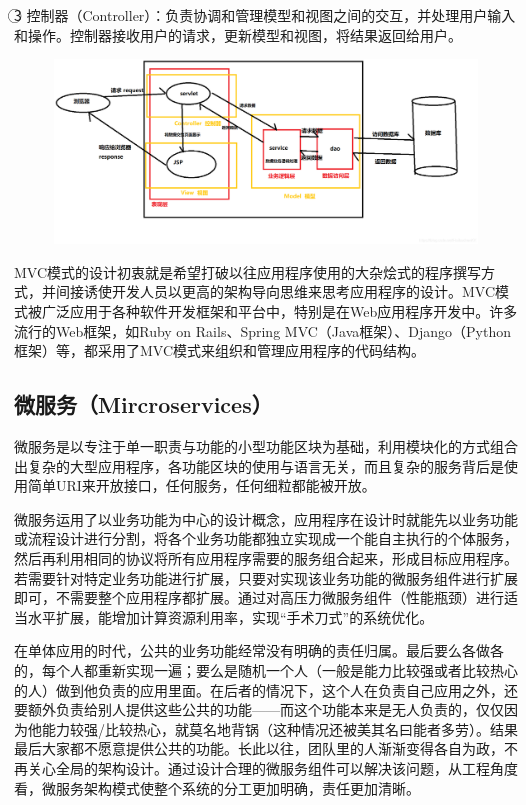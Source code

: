 \documentclass{SCIS2023cn}
\begin{document}
\textcircled{3} 控制器（Controller）：负责协调和管理模型和视图之间的交互，并处理用户输入和操作。控制器接收用户的请求，更新模型和视图，将结果返回给用户。

\begin{figure}[H]
	\centering
	\includegraphics[width=6.2in]{figs/MVC.eps}
	\label{fig_1}
\end{figure}

MVC模式的设计初衷就是希望打破以往应用程序使用的大杂烩式的程序撰写方式，并间接诱使开发人员以更高的架构导向思维来思考应用程序的设计。MVC模式被广泛应用于各种软件开发框架和平台中，特别是在Web应用程序开发中。许多流行的Web框架，如Ruby on Rails、Spring MVC（Java框架）、Django（Python框架）等，都采用了MVC模式来组织和管理应用程序的代码结构。

\subsection{微服务（Mircroservices）}

微服务是以专注于单一职责与功能的小型功能区块为基础，利用模块化的方式组合出复杂的大型应用程序，各功能区块的使用与语言无关，而且复杂的服务背后是使用简单URI来开放接口，任何服务，任何细粒都能被开放。

微服务运用了以业务功能为中心的设计概念，应用程序在设计时就能先以业务功能或流程设计进行分割，将各个业务功能都独立实现成一个能自主执行的个体服务，然后再利用相同的协议将所有应用程序需要的服务组合起来，形成目标应用程序。若需要针对特定业务功能进行扩展，只要对实现该业务功能的微服务组件进行扩展即可，不需要整个应用程序都扩展。通过对高压力微服务组件（性能瓶颈）进行适当水平扩展，能增加计算资源利用率，实现“手术刀式”的系统优化。

在单体应用的时代，公共的业务功能经常没有明确的责任归属。最后要么各做各的，每个人都重新实现一遍；要么是随机一个人（一般是能力比较强或者比较热心的人）做到他负责的应用里面。在后者的情况下，这个人在负责自己应用之外，还要额外负责给别人提供这些公共的功能——而这个功能本来是无人负责的，仅仅因为他能力较强/比较热心，就莫名地背锅（这种情况还被美其名曰能者多劳）。结果最后大家都不愿意提供公共的功能。长此以往，团队里的人渐渐变得各自为政，不再关心全局的架构设计。通过设计合理的微服务组件可以解决该问题，从工程角度看，微服务架构模式使整个系统的分工更加明确，责任更加清晰。
\end{document}
